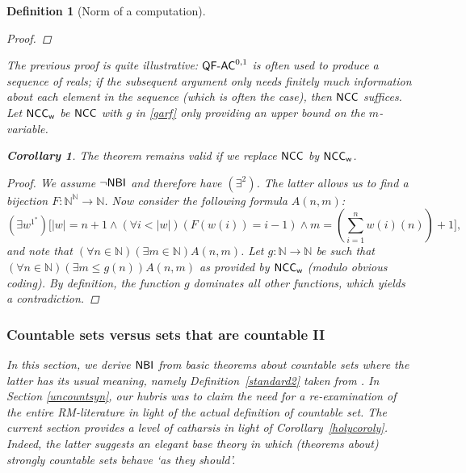 \documentclass[reqno]{amsart}
\newtheorem{cor}[thm]{Corollary}
\newtheorem{defi}[thm]{Definition}
\def\N{{\mathbb  N}}
\def\di{\rightarrow}
\def\QFAC{\textup{\textsf{QF-AC}}}
\def\NCC{\textup{\textsf{NCC}}}
\def\NBI{\textup{\textsf{NBI}}}
\def\w{\textup{\textsf{w}}}
\numberwithin{equation}{section}
\numberwithin{thm}{section}
\begin{document}
\begin{defi}[Norm of a computation]
\begin{proof}
\end{proof}
The previous proof is quite illustrative: $\QFAC^{0,1}$ is often used to produce a sequence of reals; if the subsequent argument only needs
finitely much information about each element in the sequence (which is often the case), then $\NCC$ suffices.   
Let $\NCC_{\w}$ be $\NCC$ with $g$ in \eqref{garf} only providing an \emph{upper bound} on the $m$-variable.
\begin{cor}
The theorem remains valid if we replace $\NCC$ by $\NCC_{\w}$.
\end{cor}
\begin{proof}
We assume $\neg\NBI$ and therefore have $(\exists^{2})$.  The latter allows us to find a bijection $F:\N^{\N}\di \N$.  Now consider the following formula $A(n, m)$:
\[\textstyle
(\exists w^{1^{*}})\big[|w|=n+1\wedge  (\forall i<|w|)(F(w(i)) = i-1) \wedge m =( \sum_{i = 1}^n w(i)(n)) + 1],
\]
and note that $(\forall n\in \N)(\exists m\in \N)A(n, m)$.  Let $g:\N\di \N$ be such that $(\forall n\in \N)(\exists m\leq g(n))A(n, m)$ as provided by $\NCC_{\w}$ (modulo obvious coding).
By definition, the function $g$ dominates all other functions, which yields a contradiction. 
\end{proof}
\subsubsection{Countable sets versus sets that are countable II}\label{uncountsym2}
In this section, we derive $\NBI$ from basic theorems about \emph{countable sets} where the latter has its \emph{usual} meaning, namely Definition~\ref{standard2} taken from \cite{hrbacekjech}.
In Section \ref{uncountsyn}, our \emph{hubris} was to claim the need for a re-examination of the  entire RM-literature in light of the actual definition of countable set.  
The current section provides a level of \emph{catharsis} in light of Corollary~\ref{holycoroly}.  Indeed, the latter suggests an elegant base theory in which (theorems about) strongly countable sets behave `as they should'.  

\smallskip


\end{defi}
\end{document}
